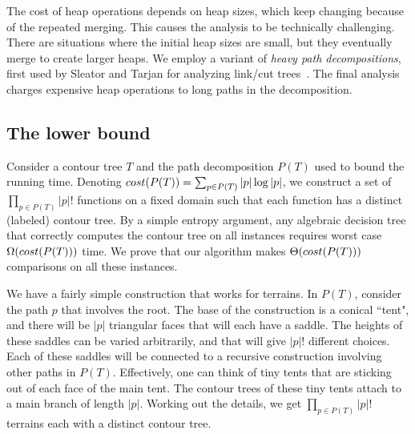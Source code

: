 {The cost of heap operations depends on heap sizes, which keep changing because
of the repeated merging. This causes the analysis to be technically challenging. There are situations where
the initial heap sizes are small, but they eventually merge to create larger heaps. 
We employ a variant
of \emph{heavy path decompositions}, first used by Sleator and Tarjan for analyzing link/cut trees~\cite{st-dsdt-83}.
The final analysis charges expensive heap operations to long paths in the decomposition.

\subsection{The lower bound} 

Consider a contour tree $T$ and the path decomposition $P(T)$ used to bound the running time. 
Denoting $\mathop{cost}(P(T)) = \sum_{p \in P(T)} |p|\log |p|$, we construct a set of $\prod_{p \in P(T)} |p|!$
functions on a fixed domain such that each function has a distinct (labeled) contour tree. By a simple
entropy argument, any algebraic decision tree that correctly computes the contour tree on all instances
requires worst case $\Omega(\mathop{cost}(P(T)))$ time. We prove that our algorithm makes $\Theta(\mathop{cost}(P(T)))$ 
comparisons on all these instances. 

We have a fairly simple construction that works for terrains. In $P(T)$, consider the path
$p$ that involves the root. The base of the construction is a conical ``tent", and there
will be $|p|$ triangular faces that will each have a saddle. The heights of these saddles
can be varied arbitrarily, and that will give $|p|!$ different choices. Each of these saddles
will be connected to a recursive construction involving other paths in $P(T)$. Effectively,
one can think of tiny tents that are sticking out of each face of the main tent. The contour
trees of these tiny tents attach to a main branch of length $|p|$. Working out the details,
we get $\prod_{p \in P(T)} |p|!$ terrains each with a distinct contour tree. 
}


